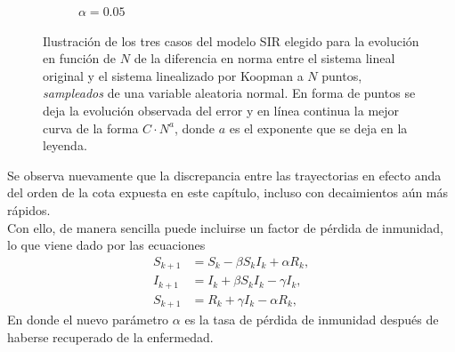 \begin{figure}[h]
\begin{subfigure}[b]{0.32\textwidth}
        \caption{$\alpha=0.05$}
    \end{subfigure}
    \caption{Ilustración de los tres casos del modelo SIR elegido para la evolución en función de $N$ de la diferencia en norma entre el sistema lineal original y el sistema linealizado por Koopman a $N$ puntos,  \textit{sampleados} de una variable aleatoria normal. En forma de puntos se deja la evolución observada del error y en línea continua la mejor curva de la forma $C \cdot N^{a}$, donde $a$ es el exponente que se deja en la leyenda.}
    \label{fig:ErrorSIR}
\end{figure}
Se observa nuevamente que la discrepancia entre las trayectorias en efecto anda del orden de la cota expuesta en este capítulo, incluso con decaimientos aún más rápidos.\\
Con ello, de manera sencilla puede incluirse un factor de pérdida de inmunidad, lo que viene dado por las ecuaciones
\begin{equation}
    \begin{aligned}
    S_{k+1} &= S_k -\beta S_k I_k + \alpha R_k, \\
    I_{k+1} &= I_k + \beta S_k I_k - \gamma I_k, \\
    S_{k+1} &= R_k + \gamma I_k - \alpha R_k,
    \end{aligned}
    \label{eq:SIR_rec}
\end{equation}
En donde el nuevo parámetro $\alpha$ es la tasa de pérdida de inmunidad después de haberse recuperado de la enfermedad.